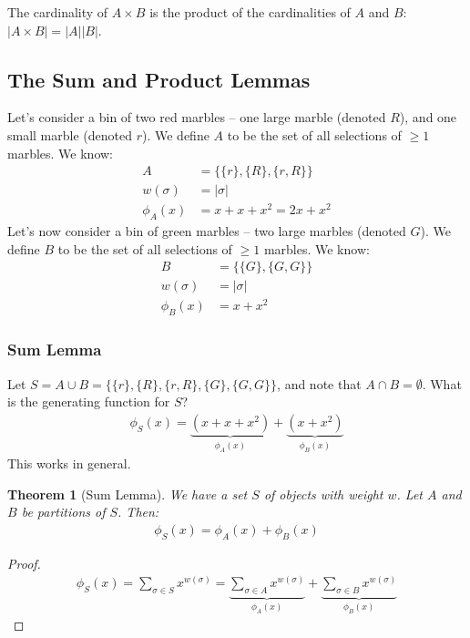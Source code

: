 \documentclass[]{article}
\newtheorem*{theorem}{Theorem}
\theoremstyle{definition}
\newcommand{\union}{\cup}
\newcommand{\intersection}{\cap}
\begin{document}
				The cardinality of $A \times B$ is the product of the cardinalities of $A$ and $B$: $|A \times B| = |A||B|$.
		\subsection{The Sum and Product Lemmas}
			Let's consider a bin of two red marbles -- one large marble (denoted $R$), and one small marble (denoted $r$). We define $A$ to be the set of all selections of $\ge 1$ marbles. We know: 
			\begin{align*}
				A &= \{ \{r\}, \{R\}, \{r, R\} \} \\
				w(\sigma) &= |\sigma| \\
				\phi_A(x) &= x + x + x^2 = 2x + x^2
			\end{align*}
			Let's now consider a bin of green marbles -- two large marbles (denoted $G$). We define $B$ to be the set of all selections of $\ge 1$ marbles. We know:
			\begin{align*}
				B &= \{ \{G\}, \{G, G\} \} \\
				w(\sigma) &= |\sigma| \\
				\phi_B(x) &= x + x^2
			\end{align*}
			\subsubsection{Sum Lemma}
				Let $S = A \union B = \{ \{r\}, \{R\}, \{r, R\}, \{G\}, \{G, G\} \}$, and note that $A \intersection B = \emptyset$. What is the generating function for $S$?
				\begin{align*}
					\phi_S(x) = \underbrace{(x + x + x^2)}_{\phi_A(x)} + \underbrace{(x  + x^2)}_{\phi_B(x)}
				\end{align*}
				This works in general.
				
				\begin{theorem}[Sum Lemma]
					We have a set $S$ of objects with weight $w$. Let $A$ and $B$ be partitions of $S$. Then:
					\begin{align*}
						\phi_S(x) = \phi_A(x) + \phi_B(x)
					\end{align*}
				\end{theorem}

				\begin{proof}
					\begin{align*}
						\phi_S(x) = \sum_{\sigma \in S} x^{w(\sigma)} = \underbrace{\sum_{\sigma \in A} x^{w(\sigma)}}_{\phi_A(x)} + \underbrace{\sum_{\sigma \in B} x^{w(\sigma)}}_{\phi_B(x)}
					\end{align*}
				\end{proof}
\end{document}
